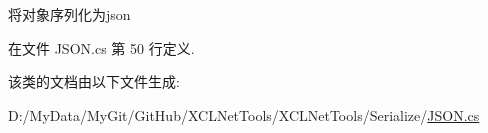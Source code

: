 将对象序列化为json 



在文件 J\-S\-O\-N.\-cs 第 50 行定义.



该类的文档由以下文件生成\-:\begin{DoxyCompactItemize}
\item 
D\-:/\-My\-Data/\-My\-Git/\-Git\-Hub/\-X\-C\-L\-Net\-Tools/\-X\-C\-L\-Net\-Tools/\-Serialize/\hyperlink{_j_s_o_n_8cs}{J\-S\-O\-N.\-cs}\end{DoxyCompactItemize}
